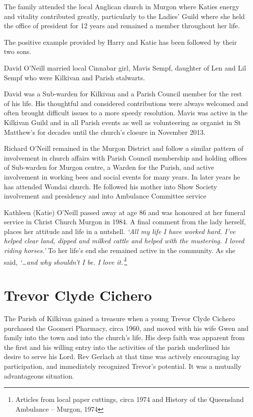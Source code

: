 The family attended the local Anglican church in Murgon where Katies energy and vitality contributed greatly, particularly to the Ladies' Guild where she held the office of president for 12 years and remained a member throughout her life.



The positive example provided by Harry and Katie has been followed by their two sons.



David O'Neill married local Cinnabar girl, Mavis Sempf, daughter of Len and Lil Sempf who were Kilkivan and Parish stalwarts.



David was a Sub-warden for Kilkivan and a Parish Council member for the rest of his life. His thoughtful and considered contributions were always welcomed and often brought difficult issues to a more speedy resolution. Mavis was active in the Kilkivan Guild and in all Parish events as well as volunteering as organist in St Matthew's for decades until the church's closure in November 2013.



Richard O'Neill remained in the Murgon District and follow a similar pattern of involvement in church affairs with Parish Council membership and holding offices of Sub-warden for Murgon centre, a Warden for the Parish, and active involvement in working bees and social events for many years. In later years he has attended Wondai church. He followed his mother into Show Society involvement and presidency and into Ambulance Committee service



Kathleen (Katie) O'Neill passed away at age 86 and was honoured at her funeral service in Christ Church Murgon in 1984. A final comment from the lady herself, places her attitude and life in a nutshell. \emph{`All my life I have worked hard. I've helped clear land, dipped and milked cattle and helped with the mustering. I loved riding horses.'} To her life's end she remained active in the community. As she said, \emph{`\ldots and why shouldn't I be. I love it.'}\footnote{Articles from local paper cuttings, circa 1974 and History of the Queensland Ambulance -- Murgon, 1974}


\section{Trevor Clyde Cichero}



The Parish of Kilkivan gained a treasure when a young Trevor Clyde Cichero purchased the Goomeri Pharmacy, circa 1960, and moved with his wife Gwen and family into the town and into the church's life. His deep faith was apparent from the first and his willing entry into the activities of the parish underlined his desire to serve his Lord. Rev Gerlach at that time was actively encouraging lay participation, and immediately recognized Trevor's potential. It was a mutually advantageous situation.



